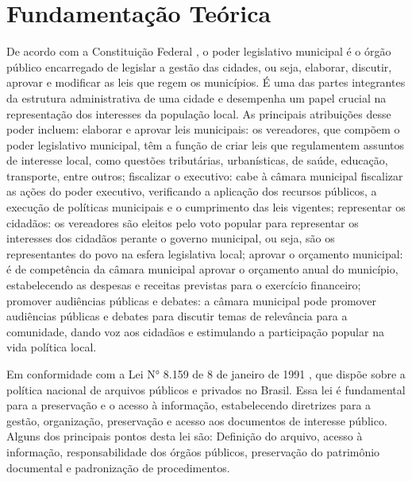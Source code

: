 \documentclass[12pt]{article}
\begin{document}
\section{Fundamentação Teórica}

De acordo com a Constituição Federal \parencite{constituicao1988art29, constituicao1988art30, constituicao1988art31}, o poder legislativo municipal é o órgão público encarregado de legislar a gestão das cidades, ou seja, elaborar, discutir, aprovar e modificar as leis que regem os municípios. É uma das partes integrantes da estrutura administrativa de uma cidade e desempenha um papel crucial na representação dos interesses da população local. As principais atribuições desse poder incluem: elaborar e aprovar leis municipais: os vereadores, que compõem o poder legislativo municipal, têm a função de criar leis que regulamentem assuntos de interesse local, como questões tributárias, urbanísticas, de saúde, educação, transporte, entre outros; fiscalizar o executivo: cabe à câmara municipal fiscalizar as ações do poder executivo, verificando a aplicação dos recursos públicos, a execução de políticas municipais e o cumprimento das leis vigentes; representar os cidadãos: os vereadores são eleitos pelo voto popular para representar os interesses dos cidadãos perante o governo municipal, ou seja, são os representantes do povo na esfera legislativa local; aprovar o orçamento municipal: é de competência da câmara municipal aprovar o orçamento anual do município, estabelecendo as despesas e receitas previstas para o exercício financeiro; promover audiências públicas e debates: a câmara municipal pode promover audiências públicas e debates para discutir temas de relevância para a comunidade, dando voz aos cidadãos e estimulando a participação popular na vida política local.

Em conformidade com a Lei N° 8.159 de 8 de janeiro de 1991 \parencite{lei8159}, que dispõe sobre a política nacional de arquivos públicos e privados no Brasil. Essa lei é fundamental para a preservação e o acesso à informação, estabelecendo diretrizes para a gestão, organização, preservação e acesso aos documentos de interesse público. Alguns dos principais pontos desta lei são: Definição do arquivo, acesso à informação, responsabilidade dos órgãos públicos, preservação do patrimônio documental e padronização de procedimentos.
\end{document}
